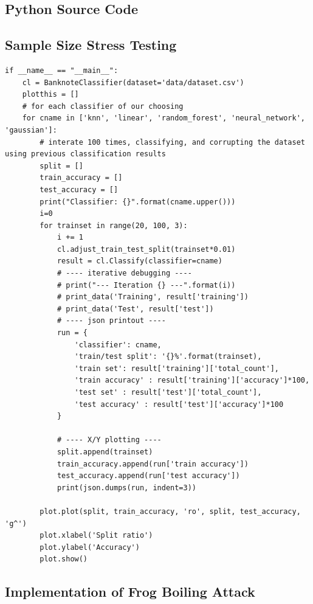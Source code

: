 \documentclass{article}
\begin{document}
\begin{appendices}
\section{Python Source Code}
\subsection{Sample Size Stress Testing}

\begin{lstlisting}
if __name__ == "__main__":
    cl = BanknoteClassifier(dataset='data/dataset.csv')
    plotthis = []
    # for each classifier of our choosing
    for cname in ['knn', 'linear', 'random_forest', 'neural_network', 'gaussian']:
        # interate 100 times, classifying, and corrupting the dataset using previous classification results
        split = []
        train_accuracy = []
        test_accuracy = []
        print("Classifier: {}".format(cname.upper()))
        i=0
        for trainset in range(20, 100, 3):
            i += 1
            cl.adjust_train_test_split(trainset*0.01)
            result = cl.Classify(classifier=cname)
            # ---- iterative debugging ----
            # print("--- Iteration {} ---".format(i))
            # print_data('Training', result['training'])
            # print_data('Test', result['test'])
            # ---- json printout ----
            run = {
                'classifier': cname,
                'train/test split': '{}%'.format(trainset),
                'train set': result['training']['total_count'],
                'train accuracy' : result['training']['accuracy']*100,
                'test set' : result['test']['total_count'],
                'test accuracy' : result['test']['accuracy']*100
            }

            # ---- X/Y plotting ----
            split.append(trainset)
            train_accuracy.append(run['train accuracy'])
            test_accuracy.append(run['test accuracy'])
            print(json.dumps(run, indent=3))

        plot.plot(split, train_accuracy, 'ro', split, test_accuracy, 'g^')
        plot.xlabel('Split ratio')
        plot.ylabel('Accuracy')
        plot.show()
\end{lstlisting}

\subsection{Implementation of Frog Boiling Attack}
\begin{lstlisting}


\end{lstlisting}
\end{appendices}
\end{document}
